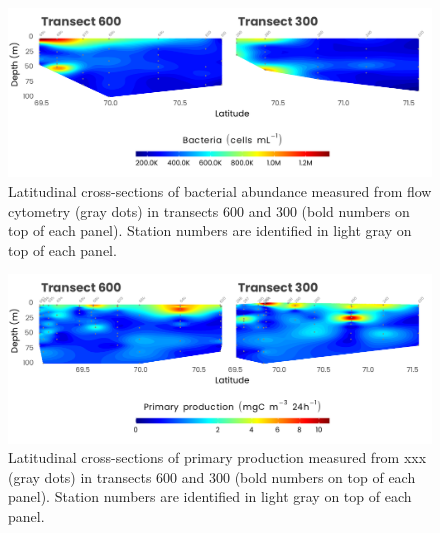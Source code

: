 \documentclass[essd, manuscript]{copernicus}
\begin{document}
\clearpage

\begin{figure}[H]
	\centering
	\includegraphics[scale = 1]{../../../graphs/fig08.pdf}
	\caption{Latitudinal cross-sections of bacterial abundance measured from flow cytometry (gray dots) in transects 600 and 300 (bold numbers on top of each panel). Station numbers are identified in light gray on top of each panel.}
\end{figure}

\clearpage

\begin{figure}[H]
	\centering
	\includegraphics[scale = 1]{../../../graphs/fig09.pdf}
	\caption{Latitudinal cross-sections of primary production measured from xxx (gray dots) in transects 600 and 300 (bold numbers on top of each panel). Station numbers are identified in light gray on top of each panel.}
\end{figure}

\clearpage
\end{document}
